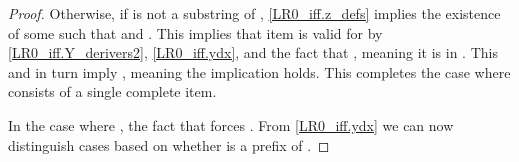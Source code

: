 \begin{isabellebody}
\begin{isamarkuptext}
\begin{theorem}
\begin{proof}
Otherwise, if \isa{{\isasymalpha}\ {\isacharat}{\kern0pt}\ {\isasymbeta}} is not a substring of \isa{{\isasymgamma}}, \eqref{LR0_iff.z_defs} implies the existence of 
some  such that \isa{\isafree{{\isasymgamma}}\ {\isacharat}{\kern0pt}\ \isafree{{\isasymdelta}{\isacharprime}{\kern0pt}}\ {\isacharequal}{\kern0pt}\ \isafree{{\isasymalpha}}\ {\isacharat}{\kern0pt}\ \isafree{{\isasymbeta}}} and . This implies 
that item  is valid for \isa{\isafree{{\isasymalpha}}\ {\isacharat}{\kern0pt}\ \isafree{{\isasymbeta}}} by \eqref{LR0_iff.Y_derivers2}, 
\eqref{LR0_iff.ydx}, and the fact that , meaning it is in . This and 
 in turn imply , meaning the implication holds. %
This completes the case where  consists of a single complete item.

In the case where , the fact that  forces
. From \eqref{LR0_iff.ydx} we can now distinguish cases based on
whether \isa{\isafree{{\isasymalpha}}\ {\isacharat}{\kern0pt}\ \isafree{{\isasymbeta}}} is a prefix of \isa{{\isasymgamma}}.


\end{proof}
\end{theorem}
\end{isamarkuptext}
\end{isabellebody}
